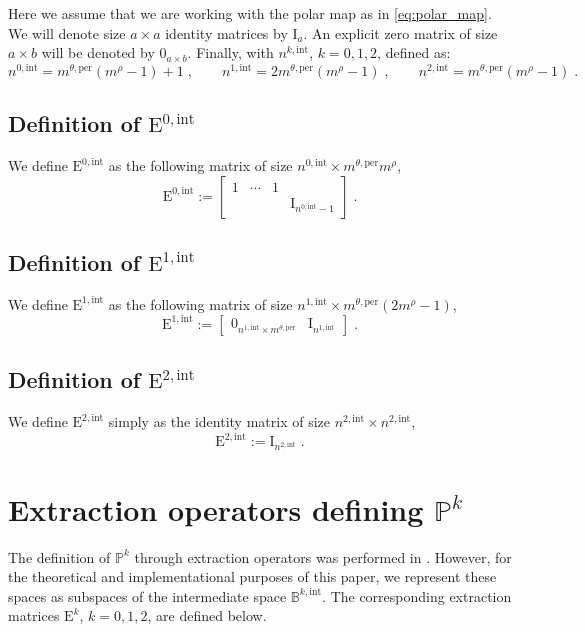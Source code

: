 \documentclass[10pt]{article}
\newcommand{\mbf}[1]{{\boldsymbol{#1}}}
\newcommand{\vSpace}[1]{\mathbb{#1}}
\newcommand{\mat}[1]{\mbf{\mathrm{#1}}}
\newcommand{\cU}{\theta}
\newcommand{\cV}{\rho}
\newcommand{\ndofV}{m^\cV}
\newcommand{\bsp}{B}
\newcommand{\bspS}{\vSpace{\bsp}}
\newcommand{\per}{\mathrm{per}}
\newcommand{\pndofU}{m^{\cU,\per}}
\newcommand{\polar}{P}
\newcommand{\polarS}{\vSpace{\polar}}
\newcommand{\polarF}[1]{\polarS^{#1}}
\newcommand{\tint}{\mathrm{int}}
\theoremstyle{plain}
\theoremstyle{definition}
\theoremstyle{remark}
\begin{document}
Here we assume that we are working with the polar map as in \eqref{eq:polar_map}.
We will denote size $a \times a$ identity matrices by $\mat{I}_a$.
An explicit zero matrix of size $a \times b$ will be denoted by $\mat{0}_{a \times b}$.
Finally, with $n^{k,\tint}$, $k = 0, 1, 2$, defined as:
\begin{equation}
    n^{0,\tint} = \pndofU(\ndofV-1) + 1\;,\qquad
    n^{1,\tint} = 2\pndofU(\ndofV-1)\;,\qquad
    n^{2,\tint} = \pndofU(\ndofV-1)\;.
\end{equation}

\subsection{Definition of $\mat{E}^{0,\tint}$}
We define $\mat{E}^{0,\tint}$ as the following matrix of size $n^{0,\tint} \times \pndofU\ndofV$,
\begin{equation}\label{eq:int-ext-0}
    \mat{E}^{0,\tint} := 
    \begin{bmatrix}
    1 & \cdots & 1 &\\
    & & & \mat{I}_{n^{0,\tint}-1}
    \end{bmatrix}\;.
\end{equation}

\subsection{Definition of $\mat{E}^{1,\tint}$}
We define $\mat{E}^{1,\tint}$ as the following matrix of size $n^{1,\tint} \times \pndofU(2\ndofV - 1)$,
\begin{equation}\label{eq:int-ext-1}
    \mat{E}^{1,\tint} := 
    \begin{bmatrix}
    \mat{0}_{n^{1,\tint} \times \pndofU} & \mat{I}_{n^{1,\tint}}
    \end{bmatrix}\;.
\end{equation}

\subsection{Definition of $\mat{E}^{2,\tint}$}
We define $\mat{E}^{2,\tint}$ simply as the identity matrix of size $n^{2,\tint} \times n^{2,\tint}$,
\begin{equation}\label{eq:int-ext-2}
    \mat{E}^{2,\tint} := \mat{I}_{n^{2,\tint}}\;.
\end{equation}
\section{Extraction operators defining $\polarF{k}$}\label{app:extraction}
The definition of $\polarF{k}$ through extraction operators was performed in \cite{Toshniwal:2021}.
However, for the theoretical and implementational purposes of this paper, we represent these spaces as subspaces of the intermediate space $\bspS^{k,\tint}$.
The corresponding extraction matrices $\mat{E}^{k}$, $k = 0, 1, 2$, are defined below.
\end{document}
